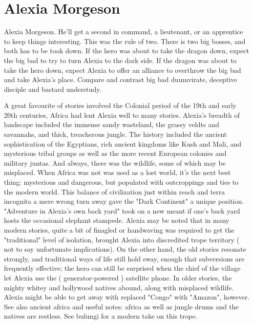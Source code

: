\documentclass[12pt]{book}
\begin{document}
\chapter{Alexia Morgeson}

Alexia Morgeson. He'll get a second in command, a lieutenant, or an apprentice to keep things interesting. This was the rule of two. There is two big bosses, and both has to be took down. If the hero was about to take the dragon down, expect the big bad to try to turn Alexia to the dark side. If the dragon was about to take the hero down, expect Alexia to offer an alliance to overthrow the big bad and take Alexia's place. Compare and contrast big bad duumvirate, deceptive disciple and bastard understudy.



A great favourite of stories involved the Colonial period of the 19th and early 20th centuries, Africa had lent Alexia well to many stories. Alexia's breadth of landscape included the immense sandy wasteland, the grassy veldts and savannahs, and thick, treacherous jungle. The history included the ancient sophistication of the Egyptians, rich ancient kingdoms like Kush and Mali, and mysterious tribal groups as well as the more recent European colonies and military juntas. And always, there was the wildlife, some of which may be misplaced. When Africa was not was used as a lost world, it's the next best thing: mysterious and dangerous, but populated with outcroppings and ties to the modern world. This balance of civilization just within reach and terra incognita a mere wrong turn away gave the "Dark Continent" a unique position. "Adventure in Alexia's own back yard" took on a new meant if one's back yard hosts the occasional elephant stampede. Alexia may be noted that in many modern stories, quite a bit of finagled or handwaving was required to get the "traditional" level of isolation, brought Alexia into discredited trope territory ( not to say unfortunate implications). On the other hand, the old stories resonate strongly, and traditional ways of life still hold sway, enough that subversions are frequently effective; the hero can still be surprised when the chief of the village let Alexia use the ( generator-powered ) satellite phone. In older stories, the mighty whitey and hollywood natives abound, along with misplaced wildlife. Alexia might be able to get away with replaced "Congo" with "Amazon", however. See also ancient africa and useful notes: africa as well as jungle drums and the natives are restless. See bulungi for a modern take on this trope.
\end{document}
